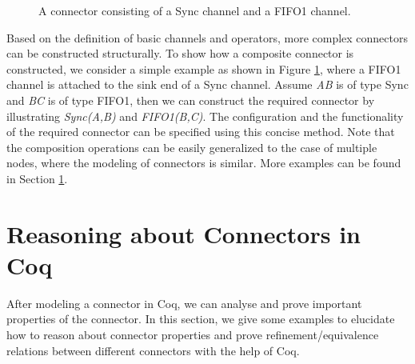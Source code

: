 \documentclass[preprint,3p]{elsarticle}
\newcommand{\xy}[1]{{#1}}
\begin{document}
\begin{figure}
\vspace{0cm}
\centering
{}
\caption{A connector consisting of a Sync channel and a FIFO1 channel.}\label{fig:compsyncfifo}
\end{figure}

Based on the definition of basic channels and operators, more complex connectors can be constructed structurally.
To show how a composite connector is constructed, we consider a simple example as shown in Figure \ref{fig:compsyncfifo}, where a FIFO1 channel is attached
to the sink end of a Sync channel. Assume \emph{AB} is of type Sync and \emph{BC} is of type FIFO1, then we can construct the required connector by
illustrating \emph{Sync(A,B)} and \emph{FIFO1(B,C)}. The configuration and the functionality of the required connector can be specified using this concise method. Note that the composition operations can be easily generalized to the case of multiple nodes, where the modeling of connectors is similar. More
examples can be found in Section \ref{sec:verification}.






\section{Reasoning about Connectors in Coq}\label{sec:verification}
After modeling a connector in Coq, we can analyse and prove important properties of the connector. In this section, we give some examples to elucidate how to
reason about connector properties and prove refinement/equivalence \xy{relations between different connectors }with the help of Coq.
\end{document}
